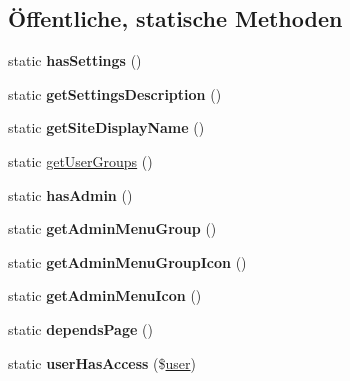 \subsection*{Öffentliche, statische Methoden}
\begin{DoxyCompactItemize}
\item 
\mbox{\label{class_two_factor_ab7741e1d9599d4d7f724c36fc5dcd416}} 
static {\bfseries has\+Settings} ()
\item 
\mbox{\label{class_two_factor_aaf00e7f17c97b1003465e8cb6a44132a}} 
static {\bfseries get\+Settings\+Description} ()
\item 
\mbox{\label{class_two_factor_ac14820b0e6963a068dcf3563462e311a}} 
static {\bfseries get\+Site\+Display\+Name} ()
\item 
static \mbox{\hyperlink{class_two_factor_a857543b4b13473b7bf28a872688af62e}{get\+User\+Groups}} ()
\item 
\mbox{\label{class_two_factor_a709fb9b0a03111ad73ab885c6fe4ecfd}} 
static {\bfseries has\+Admin} ()
\item 
\mbox{\label{class_two_factor_a6a2470b4359f502a096534bb424329ae}} 
static {\bfseries get\+Admin\+Menu\+Group} ()
\item 
\mbox{\label{class_two_factor_af16a0c34a37fb93a2d7fb876ec9a71f9}} 
static {\bfseries get\+Admin\+Menu\+Group\+Icon} ()
\item 
\mbox{\label{class_two_factor_a7dd5b067318d5085d5c96d56e170043c}} 
static {\bfseries get\+Admin\+Menu\+Icon} ()
\item 
\mbox{\label{class_two_factor_aad5ef6d47ae737a5e992f19a083ad1b1}} 
static {\bfseries depends\+Page} ()
\item 
\mbox{\label{class_two_factor_acc505c19ec62560c92d34c533461c81d}} 
static {\bfseries user\+Has\+Access} (\$\mbox{\hyperlink{classuser}{user}})
\item 
\mbox{\label{class_two_factor_a132049aaf96e278f7508bdd46a9b30eb}} 

\end{DoxyCompactItemize}
